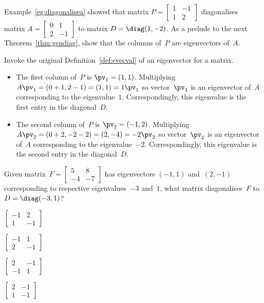 \begin{example} \label{eg:}
Example~\ref{eg:diagonalisea} showed that matrix \(P=\begin{bmatrix} 1&-1\\1&2 \end{bmatrix}\) diagonalises matrix \(A=\begin{bmatrix} 0&1\\2&-1 \end{bmatrix}\) to matrix \(D=\diag(1,-2)\). 
As a prelude to the next Theorem~\ref{thm:gendiag}, show that the columns of~\(P\) are eigenvectors of~\(A\).
\begin{solution} Invoke the original Definition~\ref{def:evecval} of an eigenvector for a matrix.
\begin{itemize}
\item The first column of~\(P\) is \(\pv_1=(1,1)\).
Multiplying \(A\pv_1=(0+1,2-1)=(1,1)=1\pv_1\) so vector~\(\pv_1\) is an eigenvector of~\(A\) corresponding to the eigenvalue~\(1\).
Correspondingly, this eigenvalue is the first entry in the diagonal~\(D\).

\item The second column of~\(P\) is \(\pv_2=(-1,2)\).
Multiplying \(A\pv_2=(0+2,-2-2)=(2,-4)=-2\pv_2\) so vector~\(\pv_2\) is an eigenvector of~\(A\) corresponding to the eigenvalue~\(-2\).
Correspondingly, this eigenvalue is the second entry in the diagonal~\(D\).
\end{itemize}
\end{solution}
\end{example}




\begin{activity}
Given matrix~\(F=\begin{bmatrix} 5&8\\-4&-7 \end{bmatrix}\) has eigenvectors \((-1,1)\) and~\((2,-1)\) corresponding to respective eigenvalues~\(-3\) and~\(1\), what matrix diagonalises~\(F\) to \(D=\diag(-3,1)\)?
\begin{parts}
\item \(\begin{bmatrix} -1&2\\1&-1 \end{bmatrix}\)\actans
\item \(\begin{bmatrix} -1&1\\2&-1 \end{bmatrix}\)
\item \(\begin{bmatrix} 2&-1\\-1&1 \end{bmatrix}\)
\item \(\begin{bmatrix} 2&-1\\1&-1 \end{bmatrix}\)
\end{parts}
\end{activity}




